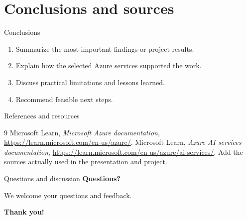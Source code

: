 \documentclass[aspectratio=169,xcolor=dvipsnames]{beamer}
\begin{document}
\section{Conclusions and sources}
\begin{frame}{Conclusions}
\begin{enumerate}
\item Summarize the most important findings or project results.
\item Explain how the selected Azure services supported the work.
\item Discuss practical limitations and lessons learned.
\item Recommend feasible next steps.
\end{enumerate}
\end{frame}
\begin{frame}{References and resources}
\small
\begin{thebibliography}{9}
 Microsoft Learn, \emph{Microsoft Azure documentation}, \url{https://learn.microsoft.com/en-us/azure/}.
 Microsoft Learn, \emph{Azure AI services documentation}, \url{https://learn.microsoft.com/en-us/azure/ai-services/}.
 Add the sources actually used in the presentation and project.
\end{thebibliography}
\end{frame}
\begin{frame}{Questions and discussion}
\centering
{\LARGE\bfseries Questions?}
\vspace{0.6cm}

{\large We welcome your questions and feedback.}
\end{frame}
\begin{frame}[plain]
\centering
{\Huge\bfseries Thank you!}
\end{frame}
\end{document}

